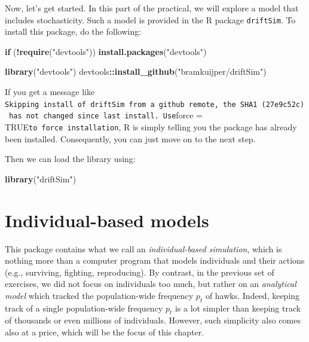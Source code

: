 \documentclass[
]{book}
\newenvironment{Shaded}{\begin{snugshade}}{\end{snugshade}}
\newcommand{\ControlFlowTok}[1]{\textcolor[rgb]{0.13,0.29,0.53}{\textbf{#1}}}
\newcommand{\FunctionTok}[1]{\textcolor[rgb]{0.13,0.29,0.53}{\textbf{#1}}}
\newcommand{\NormalTok}[1]{#1}
\newcommand{\SpecialCharTok}[1]{\textcolor[rgb]{0.81,0.36,0.00}{\textbf{#1}}}
\newcommand{\StringTok}[1]{\textcolor[rgb]{0.31,0.60,0.02}{#1}}
\begin{document}
Now, let's get started. In this part of the practical, we will explore a model that includes stochasticity. Such a model is provided in the R package \texttt{driftSim}. To install this package, do the following:

\begin{Shaded}
\begin{Highlighting}[]
\ControlFlowTok{if}\NormalTok{ (}\SpecialCharTok{!}\FunctionTok{require}\NormalTok{(}\StringTok{"devtools"}\NormalTok{)) }\FunctionTok{install.packages}\NormalTok{(}\StringTok{"devtools"}\NormalTok{)}

\FunctionTok{library}\NormalTok{(}\StringTok{"devtools"}\NormalTok{) }
\NormalTok{devtools}\SpecialCharTok{::}\FunctionTok{install\_github}\NormalTok{(}\StringTok{"bramkuijper/driftSim"}\NormalTok{)}
\end{Highlighting}
\end{Shaded}

If you get a message like \texttt{Skipping\ install\ of\ \textquotesingle{}driftSim\textquotesingle{}\ from\ a\ github\ remote,\ the\ SHA1\ (27e9c52c)\ has\ not\ changed\ since\ last\ install.\ Use}force = TRUE\texttt{to\ force\ installation}, R is simply telling you the package has already been installed. Consequently, you can just move on to the next step.

Then we can load the library using:

\begin{Shaded}
\begin{Highlighting}[]
\FunctionTok{library}\NormalTok{(}\StringTok{"driftSim"}\NormalTok{)}
\end{Highlighting}
\end{Shaded}

\section{Individual-based models}\label{individual-based-models}

This package contains what we call an \emph{individual-based simulation}, which is nothing more than a computer program that models individuals and their actions (e.g., surviving, fighting, reproducing). By contrast, in the previous set of exercises, we did not focus on individuals too much, but rather on an \emph{analytical model} which tracked the population-wide frequency \(p_{t}\) of hawks. Indeed, keeping track of a single population-wide frequency \(p_{t}\) is a lot simpler than keeping track of thousands or even millions of individuals. However, such simplicity also comes also at a price, which will be the focus of this chapter.
\end{document}
